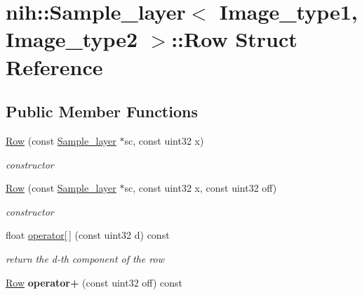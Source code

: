 \hypertarget{structnih_1_1_sample__layer_1_1_row}{
\section{nih\-:\-:\-Sample\-\_\-layer$<$ \-Image\-\_\-type1, \-Image\-\_\-type2 $>$\-:\-:\-Row \-Struct \-Reference}
\label{structnih_1_1_sample__layer_1_1_row}
}
\subsection*{\-Public \-Member \-Functions}
\begin{DoxyCompactItemize}
\item 
\hypertarget{structnih_1_1_sample__layer_1_1_row_a38626e601bea2897b6e8cedfbd26f1b1}{
\hyperlink{structnih_1_1_sample__layer_1_1_row_a38626e601bea2897b6e8cedfbd26f1b1}{\-Row} (const \hyperlink{classnih_1_1_sample__layer}{\-Sample\-\_\-layer} $\ast$sc, const uint32 x)}
\label{structnih_1_1_sample__layer_1_1_row_a38626e601bea2897b6e8cedfbd26f1b1}

\begin{DoxyCompactList}\small\item\em constructor \end{DoxyCompactList}\item 
\hypertarget{structnih_1_1_sample__layer_1_1_row_ae1ed6c22526410ff5ecc1770beb4d1d8}{
\hyperlink{structnih_1_1_sample__layer_1_1_row_ae1ed6c22526410ff5ecc1770beb4d1d8}{\-Row} (const \hyperlink{classnih_1_1_sample__layer}{\-Sample\-\_\-layer} $\ast$sc, const uint32 x, const uint32 off)}
\label{structnih_1_1_sample__layer_1_1_row_ae1ed6c22526410ff5ecc1770beb4d1d8}

\begin{DoxyCompactList}\small\item\em constructor \end{DoxyCompactList}\item 
\hypertarget{structnih_1_1_sample__layer_1_1_row_ab7d1af01ea89777966ad790cce4062e7}{
float \hyperlink{structnih_1_1_sample__layer_1_1_row_ab7d1af01ea89777966ad790cce4062e7}{operator\mbox{[}$\,$\mbox{]}} (const uint32 d) const }
\label{structnih_1_1_sample__layer_1_1_row_ab7d1af01ea89777966ad790cce4062e7}

\begin{DoxyCompactList}\small\item\em return the d-\/th component of the row \end{DoxyCompactList}\item 
\hypertarget{structnih_1_1_sample__layer_1_1_row_aeec4dba97654f776a69c84d553e6ea69}{
\hyperlink{structnih_1_1_sample__layer_1_1_row}{\-Row} {\bfseries operator+} (const uint32 off) const }
\label{structnih_1_1_sample__layer_1_1_row_aeec4dba97654f776a69c84d553e6ea69}

\end{DoxyCompactItemize}
